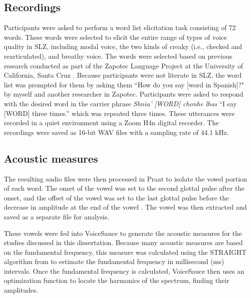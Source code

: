 \subsection{Recordings} \label{sec:acousticlandscape:recordings} 
Participants were asked to perform a word list elicitation task consisting of 72 words. These words were selected to elicit the entire range of types of voice quality in SLZ, including modal voice, the two kinds of creaky (i.e., checked and rearticulated), and breathy voice. The words were selected based on previous research conducted as part of the Zapotec Language Project at the University of California, Santa Cruz \citep{ZapotecLanguageProject}. 
Because participants were not literate in SLZ, the word list was prompted for them by asking them ``How do you say [word in Spanish]?" by myself and another researcher in Zapotec. Participants were asked to respond with the desired word in the carrier phrase \textit{Shnia' [WORD] chonhe lhas} ``I say [WORD] three times.'' which was repeated three times. These utterances were recorded in a quiet environment using a Zoom H4n digital recorder. The recordings were saved as 16-bit WAV files with a sampling rate of 44.1 kHz.

\subsection{Acoustic measures} \label{sec:acousticlandscape:analysis}

The resulting audio files were then processed in Praat to isolate the vowel portion of each word. The onset of the vowel was set to the second glottal pulse after the onset, and the offset of the vowel was set to the last glottal pulse before the decrease in amplitude at the end of the vowel \citep{garellekAcousticDiscriminabilityComplex2020}. The vowel was then extracted and saved as a separate file for analysis.

These vowels were fed into VoiceSauce \citep{shueVoiceSauceProgramVoice2011} to generate the acoustic measures for the studies discussed in this dissertation. Because many acoustic measures are based on the fundamental frequency, this measure was calculated using the STRAIGHT algorithm from \citep{kawaharaInstantaneousfrequencybasedPitchExtraction1998} to estimate the fundamental frequency in millisecond (ms) intervals. Once the fundamental frequency is calculated, VoiceSauce then uses an optimization function to locate the harmonics of the spectrum, finding their amplitudes.

